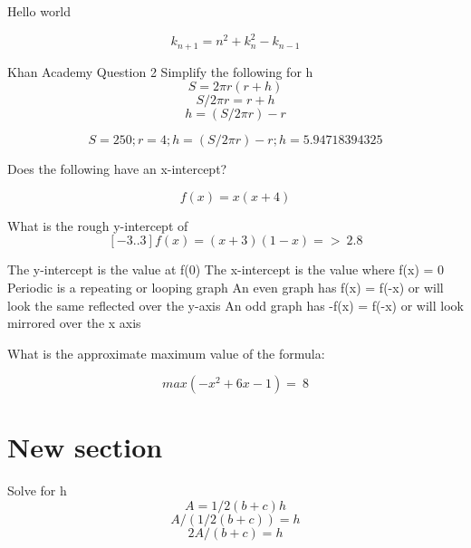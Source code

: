 \documentclass{article}
\begin{document}
Hello world


\begin{equation}
k_{n+1} = n^2 + k_n^2 - k_{n-1}
\end{equation}

Khan Academy Question 2
Simplify the following for h
\begin{equation}
S=2\pi r(r+h)
\end{equation}
\begin{equation}
S/2\pi r=r+h
\end{equation}
\begin{equation}
h=(S/2\pi r)-r
\end{equation}

\begin{equation}
  S=250;
  r=4;
  h=(S/2\pi r)-r;
  h= 5.94718394325
\end{equation}


Does the following have an x-intercept?

\begin{equation}
  f(x) = x(x+4)
\end{equation}


What is the rough y-intercept of $$[-3..3] f(x) = (x+3)(1-x) => ~2.8$$

The y-intercept is the value at f(0)
The x-intercept is the value where f(x) = 0
Periodic is a repeating or looping graph
An even graph has f(x) = f(-x) or will look the same reflected over the y-axis
An odd graph has -f(x) = f(-x) or will look mirrored over the x axis

What is the approximate maximum value of the formula:

\begin{equation}
  max(-x^2 + 6x - 1)  = ~8
\end{equation}


\section{New section}
Solve for h
\begin{equation}
  A= 1/​2 ​​ (b+c)h
\end{equation}
\begin{equation}
  A/(1/2(b+c))= h
\end{equation}
\begin{equation}
  2A/(b+c)= h
\end{equation}
\end{document}
